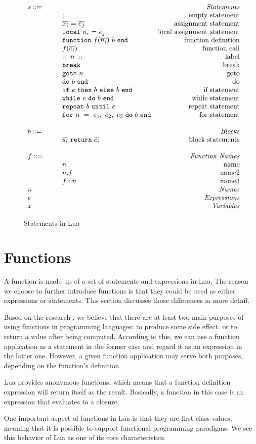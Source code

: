 \begin{figure}
\caption{Statements in Lua}
\label{fig:LuaStat}
\[
\begin{array}{llr}
\mydefhead{s ::=\qquad\qquad\qquad\qquad}{Statements}
\mydefcase{;}{empty statement}
\mydefcase{\assign x e}{assignment statement}
\mydefcase{\local n e}{local assignment statement}
\mydefcase{\function f n b}{function definition}
\mydefcase{f(\overline{e_i})}{function call}
\mydefcase{::~n~::}{label}
\mydefcase{\tt break}{break}
\mydefcase{{\tt goto} ~n}{goto}
\mydefcase{\doe b}{do}
\mydefcase{\ife e b b}{if statement}
\mydefcase{\whilee e b}{while statement}
\mydefcase{\repeate e b}{repeat statement}
\mydefcase{\for n e b}{for statement}
\\
\mydefhead{b ::=\qquad\qquad\qquad\qquad}{Blocks}
\mydefcase{\overline{s_i}~{\tt return}~\overline{e_i}}{block statements}
\\
\mydefhead{f ::=\qquad\qquad\qquad\qquad}{Function Names}
\mydefcase{n}{name}
\mydefcase{n.f}{name2}
\mydefcase{f:n}{name3}
\mydefhead{n \qquad\qquad\qquad\qquad}{Names}
\mydefhead{e \qquad\qquad\qquad\qquad}{Expressions}
\mydefhead{x \qquad\qquad\qquad\qquad}{Variables}
\end{array}
\]
\end{figure}

\section{Functions}
A function is made up of a set of statements and expressions in Lua. The reason we choose to further introduce functions is that they could be used as either expressions or statements.
This section discusses those differences in more detail.

Based on the research \cite{PIL}, we believe that there are at least two main purposes of using functions in programming languages: to produce some side effect, or to return a value after being computed. According to this, we can use a function application as a statement in the former case and regard it as an expression in the latter one. However, a given function application may serve both purposes, depending on the function's definition.

Lua provides anonymous functions, which means that a function definition expression will return itself as the result. Basically, a function in this case is an expression that evaluates to a closure.

One important aspect of functions in Lua is that they are first-class values, meaning that it is possible to support functional programming paradigms. We see this behavior of Lua as one of its core characteristics.

